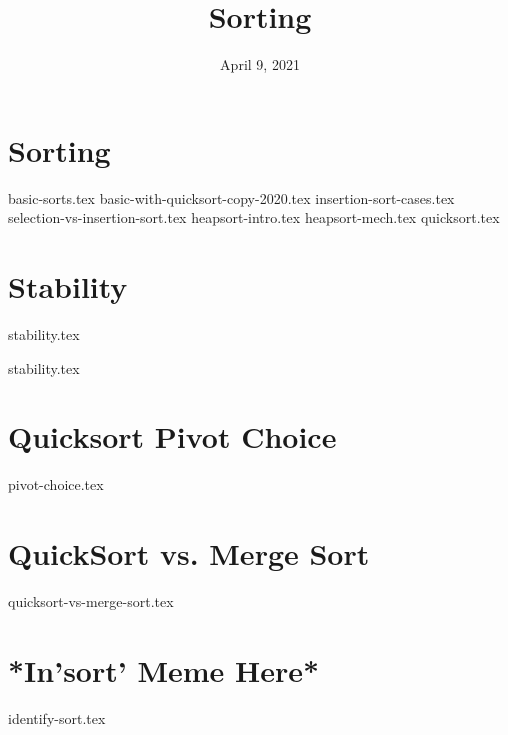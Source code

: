 \documentclass[11pt]{exam}
\title{Sorting}
\date{April 9, 2021}
\begin{document}
\maketitle

\section{Sorting}
\begin{questions}
{basic-sorts.tex}
{basic-with-quicksort-copy-2020.tex}
{insertion-sort-cases.tex}
\vspace{15mm}
{selection-vs-insertion-sort.tex}
\pagebreak
\vspace{15mm}
{heapsort-intro.tex}
\vspace{15mm}
{heapsort-mech.tex}
\vspace{15mm}
{quicksort.tex}
\end{questions}

\section{Stability}
{stability.tex}
\begin{questions}
{stability.tex}
\end{questions}

\pagebreak

\pagebreak
\section{Quicksort Pivot Choice}
\begin{questions}
{pivot-choice.tex}
\end{questions}

\pagebreak
\section{QuickSort vs. Merge Sort}
\begin{questions}
{quicksort-vs-merge-sort.tex}
\end{questions}
\clearpage

\pagebreak
\section{*In'sort' Meme Here*}
\begin{questions}
{identify-sort.tex}
\end{questions}


\pagebreak
\end{document}
